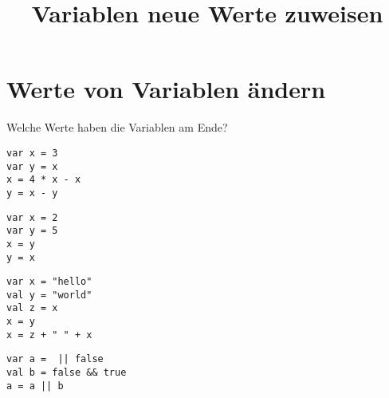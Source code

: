\documentclass[class=scrartcl, crop=false]{standalone}
\title{Variablen neue Werte zuweisen}
\begin{document}
\section{Werte von Variablen ändern}


\begin{aufgabe} \noindent




Welche Werte haben die Variablen am Ende?
\begin{teilaufgaben}
\teilaufgabe \begin{verbatim}
var x = 3
var y = x
x = 4 * x - x
y = x - y
\end{verbatim}



\teilaufgabe \begin{verbatim}
var x = 2
var y = 5
x = y
y = x
\end{verbatim}


\teilaufgabe \begin{verbatim}
var x = "hello"
val y = "world"
val z = x
x = y
x = z + " " + x
\end{verbatim}
\teilaufgabe
\begin{verbatim}
var a =  || false
val b = false && true
a = a || b
\end{verbatim}

\end{teilaufgaben}


\end{aufgabe}
\end{document}
